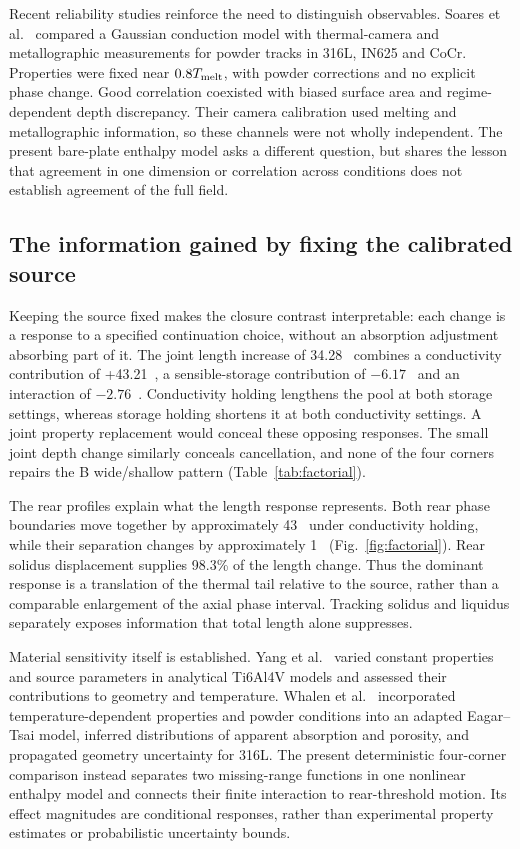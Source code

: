 Recent reliability studies reinforce the need to distinguish observables. Soares et al.~\cite{soares2026} compared a Gaussian conduction model with thermal-camera and metallographic measurements for powder tracks in 316L, IN625 and CoCr. Properties were fixed near $0.8T_{\rm melt}$, with powder corrections and no explicit phase change. Good correlation coexisted with biased surface area and regime-dependent depth discrepancy. Their camera calibration used melting and metallographic information, so these channels were not wholly independent. The present bare-plate enthalpy model asks a different question, but shares the lesson that agreement in one dimension or correlation across conditions does not establish agreement of the full field.

\subsection{The information gained by fixing the calibrated source}
Keeping the source fixed makes the closure contrast interpretable: each change is a response to a specified continuation choice, without an absorption adjustment absorbing part of it. The joint length increase of 34.28~\um{} combines a conductivity contribution of +43.21~\um{}, a sensible-storage contribution of $-6.17$~\um{} and an interaction of $-2.76$~\um{}. Conductivity holding lengthens the pool at both storage settings, whereas storage holding shortens it at both conductivity settings. A joint property replacement would conceal these opposing responses. The small joint depth change similarly conceals cancellation, and none of the four corners repairs the B wide/shallow pattern (Table~\ref{tab:factorial}).

The rear profiles explain what the length response represents. Both rear phase boundaries move together by approximately 43~\um{} under conductivity holding, while their separation changes by approximately 1~\um{} (Fig.~\ref{fig:factorial}). Rear solidus displacement supplies 98.3\% of the length change. Thus the dominant response is a translation of the thermal tail relative to the source, rather than a comparable enlargement of the axial phase interval. Tracking solidus and liquidus separately exposes information that total length alone suppresses.

Material sensitivity itself is established. Yang et al.~\cite{yang2024} varied constant properties and source parameters in analytical Ti6Al4V models and assessed their contributions to geometry and temperature. Whalen et al.~\cite{whalen2021} incorporated temperature-dependent properties and powder conditions into an adapted Eagar--Tsai model, inferred distributions of apparent absorption and porosity, and propagated geometry uncertainty for 316L. The present deterministic four-corner comparison instead separates two missing-range functions in one nonlinear enthalpy model and connects their finite interaction to rear-threshold motion. Its effect magnitudes are conditional responses, rather than experimental property estimates or probabilistic uncertainty bounds.

